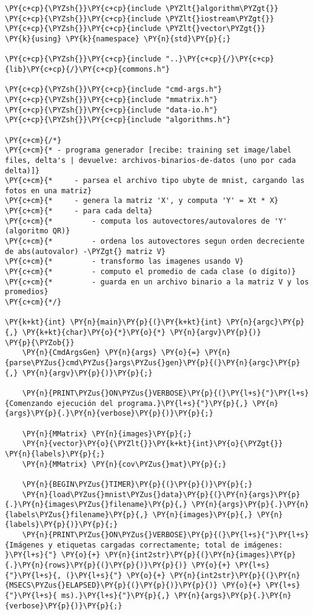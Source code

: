 \begin{Verbatim}[commandchars=\\\{\}]
\PY{c+cp}{\PYZsh{}}\PY{c+cp}{include \PYZlt{}algorithm\PYZgt{}}
\PY{c+cp}{\PYZsh{}}\PY{c+cp}{include \PYZlt{}iostream\PYZgt{}}
\PY{c+cp}{\PYZsh{}}\PY{c+cp}{include \PYZlt{}vector\PYZgt{}}
\PY{k}{using} \PY{k}{namespace} \PY{n}{std}\PY{p}{;}

\PY{c+cp}{\PYZsh{}}\PY{c+cp}{include "..}\PY{c+cp}{/}\PY{c+cp}{lib}\PY{c+cp}{/}\PY{c+cp}{commons.h"}

\PY{c+cp}{\PYZsh{}}\PY{c+cp}{include "cmd-args.h"}
\PY{c+cp}{\PYZsh{}}\PY{c+cp}{include "mmatrix.h"}
\PY{c+cp}{\PYZsh{}}\PY{c+cp}{include "data-io.h"}
\PY{c+cp}{\PYZsh{}}\PY{c+cp}{include "algorithms.h"}

\PY{c+cm}{/*}
\PY{c+cm}{* - programa generador [recibe: training set image/label files, delta's | devuelve: archivos-binarios-de-datos (uno por cada delta)]}
\PY{c+cm}{* 	- parsea el archivo tipo ubyte de mnist, cargando las fotos en una matriz}
\PY{c+cm}{* 	- genera la matriz 'X', y computa 'Y' = Xt * X}
\PY{c+cm}{* 	- para cada delta}
\PY{c+cm}{* 		- computa los autovectores/autovalores de 'Y' (algoritmo QR)}
\PY{c+cm}{* 		- ordena los autovectores segun orden decreciente de abs(autovalor) -\PYZgt{} matriz V}
\PY{c+cm}{* 		- transformo las imagenes usando V}
\PY{c+cm}{* 		- computo el promedio de cada clase (o dígito)}
\PY{c+cm}{* 		- guarda en un archivo binario a la matriz V y los promedios}
\PY{c+cm}{*/}

\PY{k+kt}{int} \PY{n}{main}\PY{p}{(}\PY{k+kt}{int} \PY{n}{argc}\PY{p}{,} \PY{k+kt}{char}\PY{o}{*}\PY{o}{*} \PY{n}{argv}\PY{p}{)}
\PY{p}{\PYZob{}}
	\PY{n}{CmdArgsGen} \PY{n}{args} \PY{o}{=} \PY{n}{parse\PYZus{}cmd\PYZus{}args\PYZus{}gen}\PY{p}{(}\PY{n}{argc}\PY{p}{,} \PY{n}{argv}\PY{p}{)}\PY{p}{;}

	\PY{n}{PRINT\PYZus{}ON\PYZus{}VERBOSE}\PY{p}{(}\PY{l+s}{"}\PY{l+s}{Comenzando ejecución del programa.}\PY{l+s}{"}\PY{p}{,} \PY{n}{args}\PY{p}{.}\PY{n}{verbose}\PY{p}{)}\PY{p}{;}

	\PY{n}{MMatrix} \PY{n}{images}\PY{p}{;}
	\PY{n}{vector}\PY{o}{\PYZlt{}}\PY{k+kt}{int}\PY{o}{\PYZgt{}} \PY{n}{labels}\PY{p}{;}
	\PY{n}{MMatrix} \PY{n}{cov\PYZus{}mat}\PY{p}{;}

	\PY{n}{BEGIN\PYZus{}TIMER}\PY{p}{(}\PY{p}{)}\PY{p}{;}
	\PY{n}{load\PYZus{}mnist\PYZus{}data}\PY{p}{(}\PY{n}{args}\PY{p}{.}\PY{n}{images\PYZus{}filename}\PY{p}{,} \PY{n}{args}\PY{p}{.}\PY{n}{labels\PYZus{}filename}\PY{p}{,} \PY{n}{images}\PY{p}{,} \PY{n}{labels}\PY{p}{)}\PY{p}{;}
	\PY{n}{PRINT\PYZus{}ON\PYZus{}VERBOSE}\PY{p}{(}\PY{l+s}{"}\PY{l+s}{Imágenes y etiquetas cargadas correctamente; total de imágenes: }\PY{l+s}{"} \PY{o}{+} \PY{n}{int2str}\PY{p}{(}\PY{n}{images}\PY{p}{.}\PY{n}{rows}\PY{p}{(}\PY{p}{)}\PY{p}{)} \PY{o}{+} \PY{l+s}{"}\PY{l+s}{, (}\PY{l+s}{"} \PY{o}{+} \PY{n}{int2str}\PY{p}{(}\PY{n}{MSECS\PYZus{}ELAPSED}\PY{p}{(}\PY{p}{)}\PY{p}{)} \PY{o}{+} \PY{l+s}{"}\PY{l+s}{ ms).}\PY{l+s}{"}\PY{p}{,} \PY{n}{args}\PY{p}{.}\PY{n}{verbose}\PY{p}{)}\PY{p}{;}


\end{Verbatim}
